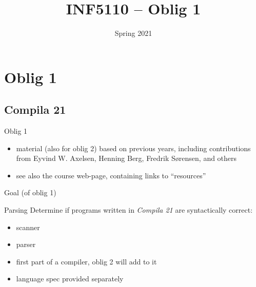 \documentclass{beamer}
\date{Spring 2021}
\title{INF5110 -- Oblig 1}
\renewcommand{\maketitle}{}
\begin{document}
\maketitle
\chapter{Oblig 1}
\label{sec:org4615c46}



\section{Compila 21}
\label{sec:orgc55746b}

\begin{frame}[label={sec:org2675ec5}]{Oblig 1}
\begin{itemize}
\item material (also for oblig 2) based on previous years, including contributions from Eyvind
W. Axelsen, Henning Berg, Fredrik Sørensen, and others
\end{itemize}


\begin{itemize}
\item see also the course web-page, containing links to ``resources''
\end{itemize}
\end{frame}


\begin{frame}[label={sec:orgea7f2d0}]{Goal (of oblig 1)}
\begin{block}{Parsing}
Determine if programs written in \emph{Compila 21} are syntactically correct: 

\begin{itemize}
\item scanner
\item parser
\end{itemize}
\end{block}


\begin{itemize}
\item first part of a compiler, oblig 2 will add to it
\item language spec provided separately
\end{itemize}
\end{frame}
\end{document}
